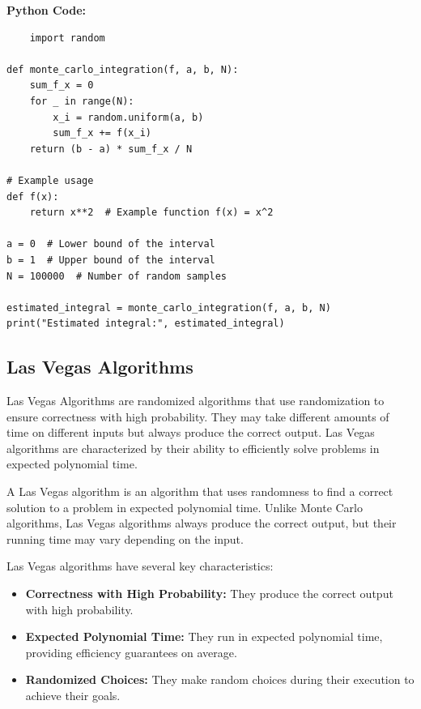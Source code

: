 \documentclass[12pt]{book} %
\begin{document}
\textbf{Python Code:}
\FloatBarrier
\begin{lstlisting}
    import random

def monte_carlo_integration(f, a, b, N):
    sum_f_x = 0
    for _ in range(N):
        x_i = random.uniform(a, b)
        sum_f_x += f(x_i)
    return (b - a) * sum_f_x / N

# Example usage
def f(x):
    return x**2  # Example function f(x) = x^2

a = 0  # Lower bound of the interval
b = 1  # Upper bound of the interval
N = 100000  # Number of random samples

estimated_integral = monte_carlo_integration(f, a, b, N)
print("Estimated integral:", estimated_integral)
\end{lstlisting}

\subsection{Las Vegas Algorithms}
Las Vegas Algorithms are randomized algorithms that use randomization to ensure correctness with high probability. They may take different amounts of time on different inputs but always produce the correct output. Las Vegas algorithms are characterized by their ability to efficiently solve problems in expected polynomial time.

A Las Vegas algorithm is an algorithm that uses randomness to find a correct solution to a problem in expected polynomial time. Unlike Monte Carlo algorithms, Las Vegas algorithms always produce the correct output, but their running time may vary depending on the input.

Las Vegas algorithms have several key characteristics:
\begin{itemize}
    \item \textbf{Correctness with High Probability:} They produce the correct output with high probability.
    \item \textbf{Expected Polynomial Time:} They run in expected polynomial time, providing efficiency guarantees on average.
    \item \textbf{Randomized Choices:} They make random choices during their execution to achieve their goals.
\end{itemize}
\end{document}
